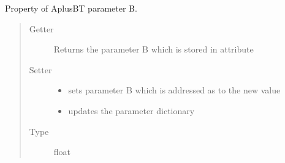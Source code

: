 \documentclass[letterpaper,10pt,english]{sphinxmanual}
\begin{document}
\begin{fulllineitems}
\begin{fulllineitems}
\begin{quote}
\begin{description}
\end{description}\end{quote}

\end{fulllineitems}


\begin{fulllineitems}
\label{api/climlab.radiation:climlab.radiation.AplusBT.AplusBT.B}
Property of AplusBT parameter B.
\begin{quote}\begin{description}
\item[{Getter}] \leavevmode
Returns the parameter B which is stored in attribute 

\item[{Setter}] \leavevmode\begin{itemize}
\item {} 
sets parameter B which is addressed as 
to the new value

\item {} 
updates the parameter dictionary 

\end{itemize}

\item[{Type}] \leavevmode
float

\end{description}\end{quote}

\end{fulllineitems}


\end{fulllineitems}

\end{document}
